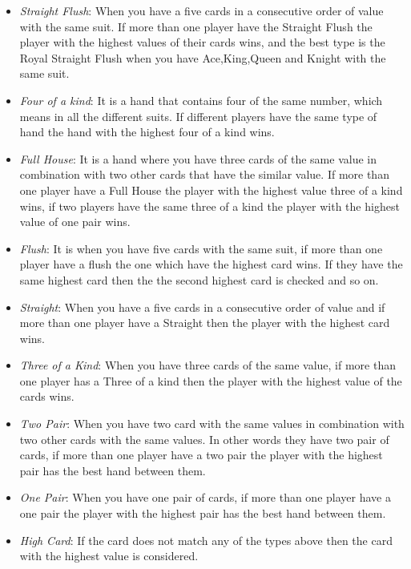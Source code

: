 \documentclass[journal]{vgtc}                %
\begin{document}
\begin{itemize}
  \item \textit{Straight Flush}: When you have a five cards in a consecutive order of value with the same suit. If more than one player have the Straight Flush the player with the highest values of their cards wins, and the best type is the Royal Straight Flush when you have Ace,King,Queen and Knight with the same suit.
  \item \textit{Four of a kind}: It is a hand that contains four of the same number, which means in all the different suits. If different players have the same type of hand the hand with the highest four of a kind wins.
  \item \textit{Full House}:   It is a hand where you have three cards of the same value in combination with two other cards that have the similar value. If more than one player have a Full House the player with the highest value three of a kind wins, if two players have the same three of a kind the player with the highest value of one pair wins.
  \item \textit{Flush}: It is when you have five cards with the same suit, if more than one player have a flush the one which have the highest card wins. If they have the same highest card then the the second highest card is checked and so on.
  \item \textit{Straight}: When you have a five cards in a consecutive order of value and if more than one player have a Straight then the player with the highest card wins.
  \item \textit{Three of a Kind}: When you have three cards of the same value, if more than one player has a Three of a kind then the player with the highest value of the cards wins.
  \item \textit{Two Pair}: When you have two card with the same values in combination with two other cards with the same values. In other words they have two pair of cards, if more than one player have a two pair the player with the highest pair has the best hand between them.
  \item \textit{One Pair}: When you have one pair of cards, if more than one player have a one pair the player with the highest pair has the best hand between them.
  \item \textit{High Card}: If the card does not match any of the types above then the card with the highest value is considered.

\end{itemize}
\end{document}
